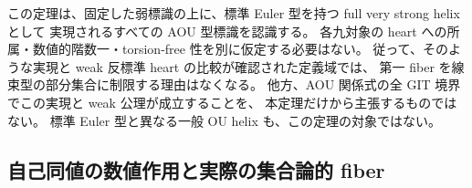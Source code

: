 \begin{remark}\label{rem:aou-line-converse}
この定理は、固定した弱標識の上に、標準 Euler 型を持つ full very strong helix として
実現されるすべての AOU 型標識を認識する。
各九対象の heart への所属・数値的階数一・torsion-free 性を別に仮定する必要はない。
従って、そのような実現と weak 反標準 heart の比較が確認された定義域では、
第一 fiber を線束型の部分集合に制限する理由はなくなる。
他方、AOU 関係式の全 GIT 境界でこの実現と weak 公理が成立することを、
本定理だけから主張するものではない。
標準 Euler 型と異なる一般 OU helix も、この定理の対象ではない。
\end{remark}

\subsection{自己同値の数値作用と実際の集合論的 fiber}

